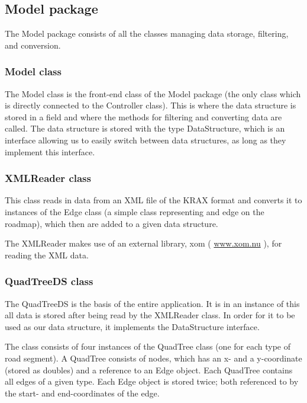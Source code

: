\documentclass[a4paper,11pt]{article}
\begin{document}
\subsection{Model package} %
The Model package consists of all the classes managing data storage, filtering, and conversion.

\subsubsection{Model class} %
The Model class is the front-end class of the Model package (the only class which is directly connected to the Controller class). This is where the data structure is stored in a field and where the methods for filtering and converting data are called. The data structure is stored with the type DataStructure, which is an interface allowing us to easily switch between data structures, as long as they implement this interface.

\subsubsection{XMLReader class} %
This class reads in data from an XML file of the KRAX format and converts it to instances of the Edge class (a simple class representing and edge on the roadmap), which then are added to a given data structure.

The XMLReader makes use of an external library, xom (
\url{www.xom.nu}
), for reading the XML data.

\subsubsection{QuadTreeDS class} %
The QuadTreeDS is the basis of the entire application. It is in an instance of this all data is stored after being read by the XMLReader class. In order for it to be used as our data structure, it implements the DataStructure interface.

The class consists of four instances of the QuadTree class (one for each type of road segment). A QuadTree consists of nodes, which has an x- and a y-coordinate (stored as doubles) and a reference to an Edge object. Each QuadTree contains all edges of a given type. Each Edge object is stored twice; both referenced to by the start- and end-coordinates of the edge.
\end{document}
